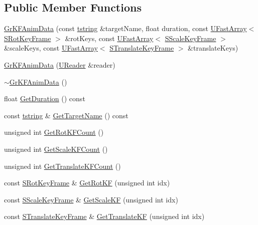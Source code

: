 \subsection*{Public Member Functions}
\begin{CompactItemize}
\item 
\hyperlink{class_gr_k_f_anim_data_3eb49b566e57e8864da2a6cd801af2fe}{GrKFAnimData} (const \hyperlink{common__afx_8h_816fa58fd77499b0edb2c69ebe803d5c}{tstring} \&targetName, float duration, const \hyperlink{class_u_fast_array}{UFastArray}$<$ \hyperlink{struct_gr_k_f_anim_data_1_1_s_rot_key_frame}{SRotKeyFrame} $>$ \&rotKeys, const \hyperlink{class_u_fast_array}{UFastArray}$<$ \hyperlink{struct_gr_k_f_anim_data_1_1_s_scale_key_frame}{SScaleKeyFrame} $>$ \&scaleKeys, const \hyperlink{class_u_fast_array}{UFastArray}$<$ \hyperlink{struct_gr_k_f_anim_data_1_1_s_translate_key_frame}{STranslateKeyFrame} $>$ \&translateKeys)
\item 
\hyperlink{class_gr_k_f_anim_data_3d55c09cf537c58a6a83eba0818e2b83}{GrKFAnimData} (\hyperlink{class_u_reader}{UReader} \&reader)
\item 
\hyperlink{class_gr_k_f_anim_data_93cd2a5c279af2b5c8718808383e65d9}{$\sim$GrKFAnimData} ()
\item 
float \hyperlink{class_gr_k_f_anim_data_e741a43f1dee1899c19991f7e2fbcd7a}{GetDuration} () const 
\item 
const \hyperlink{common__afx_8h_816fa58fd77499b0edb2c69ebe803d5c}{tstring} \& \hyperlink{class_gr_k_f_anim_data_b6567627550f063030476e6bd58fb72b}{GetTargetName} () const 
\item 
unsigned int \hyperlink{class_gr_k_f_anim_data_9d7773764a0a4a6816b3feec7c7ea350}{GetRotKFCount} ()
\item 
unsigned int \hyperlink{class_gr_k_f_anim_data_f74c053a04b17c4c8a939d74ff255e65}{GetScaleKFCount} ()
\item 
unsigned int \hyperlink{class_gr_k_f_anim_data_5a804a1ef5236f33533f2c42e4d47589}{GetTranslateKFCount} ()
\item 
const \hyperlink{struct_gr_k_f_anim_data_1_1_s_rot_key_frame}{SRotKeyFrame} \& \hyperlink{class_gr_k_f_anim_data_f6cfbffb7c637eb8fe5305d36a7f2ebf}{GetRotKF} (unsigned int idx)
\item 
const \hyperlink{struct_gr_k_f_anim_data_1_1_s_scale_key_frame}{SScaleKeyFrame} \& \hyperlink{class_gr_k_f_anim_data_5dd218dbf01f0898af6b7abd891a743d}{GetScaleKF} (unsigned int idx)
\item 
const \hyperlink{struct_gr_k_f_anim_data_1_1_s_translate_key_frame}{STranslateKeyFrame} \& \hyperlink{class_gr_k_f_anim_data_bf3fbd8ffab0b28a70a13cbe571fd267}{GetTranslateKF} (unsigned int idx)

\end{CompactItemize}
